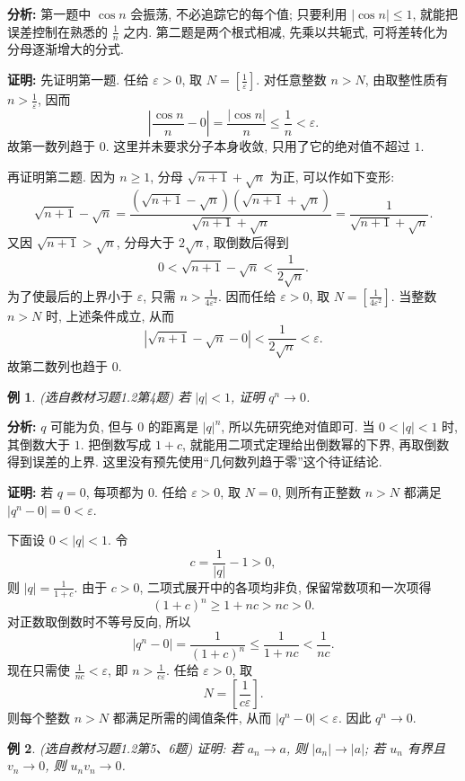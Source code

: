 \documentclass[UTF8,openany]{ctexbook}
\theoremstyle{chinesetextbook}
\newtheorem{example}{例}[section]
\newenvironment{cnproof}{\par\indent\textbf{证明:} \ignorespaces}{\par}
\begin{document}
\par\indent\textbf{分析:} 第一题中 $\cos n$ 会振荡, 不必追踪它的每个值; 只要利用 $|\cos n|\le1$, 就能把误差控制在熟悉的 $\displaystyle\frac1n$ 之内. 第二题是两个根式相减, 先乘以共轭式, 可将差转化为分母逐渐增大的分式.
\begin{cnproof}
先证明第一题. 任给 $\varepsilon>0$, 取 $\displaystyle N=\left[\frac1\varepsilon\right]$. 对任意整数 $n>N$, 由取整性质有 $\displaystyle n>\frac1\varepsilon$, 因而
\[
\left|\frac{\cos n}{n}-0\right|
=\frac{|\cos n|}{n}\le\frac1n<\varepsilon.
\]
故第一数列趋于 $0$. 这里并未要求分子本身收敛, 只用了它的绝对值不超过 $1$.

再证明第二题. 因为 $n\ge1$, 分母 $\sqrt{n+1}+\sqrt n$ 为正, 可以作如下变形:
\[
\sqrt{n+1}-\sqrt n
=\frac{(\sqrt{n+1}-\sqrt n)(\sqrt{n+1}+\sqrt n)}{\sqrt{n+1}+\sqrt n}
=\frac1{\sqrt{n+1}+\sqrt n}.
\]
又因 $\sqrt{n+1}>\sqrt n$, 分母大于 $2\sqrt n$, 取倒数后得到
\[
0<\sqrt{n+1}-\sqrt n<\frac1{2\sqrt n}.
\]
为了使最后的上界小于 $\varepsilon$, 只需 $\displaystyle n>\frac1{4\varepsilon^2}$. 因而任给 $\varepsilon>0$, 取 $\displaystyle N=\left[\frac1{4\varepsilon^2}\right]$. 当整数 $n>N$ 时, 上述条件成立, 从而
\[
\left|\sqrt{n+1}-\sqrt n-0\right|<\frac1{2\sqrt n}<\varepsilon.
\]
故第二数列也趋于 $0$.
\end{cnproof}
\begin{example}
(选自教材习题1.2第4题) 若 $|q|<1$, 证明 $q^n\to0$.
\end{example}
\par\indent\textbf{分析:} $q$ 可能为负, 但与 $0$ 的距离是 $|q|^n$, 所以先研究绝对值即可. 当 $0<|q|<1$ 时, 其倒数大于 $1$. 把倒数写成 $1+c$, 就能用二项式定理给出倒数幂的下界, 再取倒数得到误差的上界. 这里没有预先使用“几何数列趋于零”这个待证结论.
\begin{cnproof}
若 $q=0$, 每项都为 $0$. 任给 $\varepsilon>0$, 取 $N=0$, 则所有正整数 $n>N$ 都满足 $|q^n-0|=0<\varepsilon$.

下面设 $0<|q|<1$. 令
\[
c=\frac1{|q|}-1>0,
\]
则 $\displaystyle |q|=\frac1{1+c}$. 由于 $c>0$, 二项式展开中的各项均非负, 保留常数项和一次项得
\[
(1+c)^n\ge1+nc>nc>0.
\]
对正数取倒数时不等号反向, 所以
\[
|q^n-0|=\frac1{(1+c)^n}\le\frac1{1+nc}<\frac1{nc}.
\]
现在只需使 $\displaystyle\frac1{nc}<\varepsilon$, 即 $\displaystyle n>\frac1{c\varepsilon}$. 任给 $\varepsilon>0$, 取
\[
N=\left[\frac1{c\varepsilon}\right].
\]
则每个整数 $n>N$ 都满足所需的阈值条件, 从而 $|q^n-0|<\varepsilon$. 因此 $q^n\to0$.
\end{cnproof}
\begin{example}
(选自教材习题1.2第5、6题) 证明: 若 $a_n\to a$, 则 $|a_n|\to|a|$; 若 $u_n$ 有界且 $v_n\to0$, 则 $u_nv_n\to0$.
\end{example}
\end{document}
